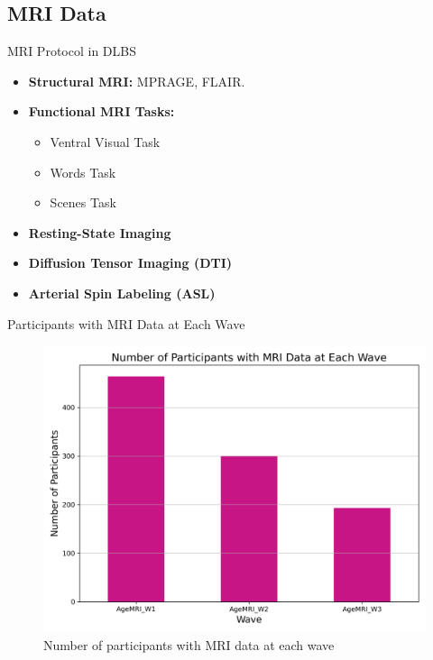 \documentclass{beamer}
\begin{document}
\subsection{MRI Data}

\begin{frame}{MRI Protocol in DLBS}
  \begin{itemize}
    \item \textbf{Structural MRI:} MPRAGE, FLAIR.
    \item \textbf{Functional MRI Tasks:}
      \begin{itemize}
        \item Ventral Visual Task
        \item Words Task
        \item Scenes Task
      \end{itemize}
    \item \textbf{Resting-State Imaging}
    \item \textbf{Diffusion Tensor Imaging (DTI)}
    \item \textbf{Arterial Spin Labeling (ASL)}
  \end{itemize}
\end{frame}

\begin{frame}{Participants with MRI Data at Each Wave}
  \begin{figure}
    \centering
    \includegraphics[width=0.6\linewidth]{participants_per_wave.png}
    \caption{Number of participants with MRI data at each wave}
  \end{figure}
\end{frame}
\end{document}
